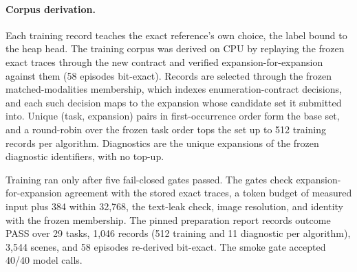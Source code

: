 \paragraph{Corpus derivation.}
Each training record teaches the exact reference's own choice, the label bound to the heap head. The training corpus was derived on CPU by replaying the frozen exact traces through the new contract and verified expansion-for-expansion against them (58 episodes bit-exact). Records are selected through the frozen matched-modalities membership, which indexes enumeration-contract decisions, and each such decision maps to the expansion whose candidate set it submitted into. Unique (task, expansion) pairs in first-occurrence order form the base set, and a round-robin over the frozen task order tops the set up to 512 training records per algorithm. Diagnostics are the unique expansions of the frozen diagnostic identifiers, with no top-up.

Training ran only after five fail-closed gates passed. The gates check expansion-for-expansion agreement with the stored exact traces, a token budget of measured input plus 384 within 32,768, the text-leak check, image resolution, and identity with the frozen membership. The pinned preparation report records outcome PASS over 29 tasks, 1,046 records (512 training and 11 diagnostic per algorithm), 3,544 scenes, and 58 episodes re-derived bit-exact. The smoke gate accepted 40/40 model calls.


